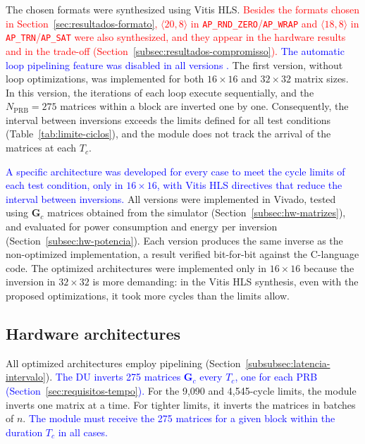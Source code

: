 The chosen formats were synthesized using Vitis HLS. \textcolor{red}{Besides the formats chosen in Section~\ref{sec:resultados-formato}, $\langle 20,8\rangle$ in \texttt{AP\_RND\_ZERO}/\texttt{AP\_WRAP} and $\langle 18,8\rangle$ in \texttt{AP\_TRN}/\texttt{AP\_SAT} were also synthesized, and they appear in the hardware results and in the trade-off (Section~\ref{subsec:resultados-compromisso}).}
 \textcolor{blue}{The automatic loop pipelining feature was disabled in all versions \cite[p.~42]{ug1399}.} The first version, without loop optimizations, was implemented for both $16 \times 16$ and $32 \times 32$ matrix sizes. In this version, the iterations of each loop execute sequentially, and the $N_{\text{PRB}} = 275$ matrices within a block are inverted one by one. Consequently, the interval between inversions exceeds the limits defined for all test conditions (Table~\ref{tab:limite-ciclos}), and the module does not track the arrival of the matrices at each $T_c$.

\textcolor{blue}{A specific architecture was developed for every case to meet the cycle limits of each test condition, only in $16 \times 16$, with Vitis HLS directives that reduce the interval between inversions.} All versions were implemented in Vivado, tested using $\mathbf G_c$ matrices obtained from the simulator (Section~\ref{subsec:hw-matrizes}), and evaluated for power consumption and energy per inversion (Section~\ref{subsec:hw-potencia}). Each version produces the same inverse as the non-optimized implementation, a result verified bit-for-bit against the C-language code.
The optimized architectures were implemented only in $16 \times 16$ because the inversion in $32 \times 32$ is more demanding: in the Vitis HLS synthesis, even with the proposed optimizations, it took more cycles than the limits allow.

\subsection{\texorpdfstring{Hardware architectures}{Hardware architectures}}\label{subsec:hw-arquiteturas}
All optimized architectures employ pipelining (Section~\ref{subsubsec:latencia-intervalo}). \textcolor{blue}{The DU inverts 275 matrices $\mathbf G_c$ every $T_c$, one for each PRB (Section~\ref{sec:requisitos-tempo}).} For the 9,090 and 4,545-cycle limits, the module inverts one matrix at a time. For tighter limits, it inverts the matrices in batches of $n$. \textcolor{blue}{The module must receive the 275 matrices for a given block within the duration $T_c$ in all cases.}

